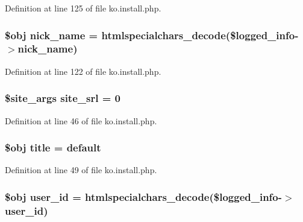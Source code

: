 Definition at line 125 of file ko.\+install.\+php.

\hypertarget{ko_8install_8php_a151ecae87a1f3d7e257aa089803086bd}{}
\subsubsection[{nick\+\_\+name}]{\setlength{\rightskip}{0pt plus 5cm}\$obj nick\+\_\+name = htmlspecialchars\+\_\+decode(\$logged\+\_\+info-\/$>$nick\+\_\+name)}\label{ko_8install_8php_a151ecae87a1f3d7e257aa089803086bd}


Definition at line 122 of file ko.\+install.\+php.

\hypertarget{ko_8install_8php_a8b1406b4ad1048041558dce6bfe89004}{}
\subsubsection[{site\+\_\+srl}]{\setlength{\rightskip}{0pt plus 5cm}\$site\+\_\+args site\+\_\+srl = 0}\label{ko_8install_8php_a8b1406b4ad1048041558dce6bfe89004}


Definition at line 46 of file ko.\+install.\+php.

\hypertarget{ko_8install_8php_a5b072c5fd1d2228c6ba5cee13cd142e3}{}
\subsubsection[{title}]{\setlength{\rightskip}{0pt plus 5cm}\$obj title = \textquotesingle{}default\textquotesingle{}}\label{ko_8install_8php_a5b072c5fd1d2228c6ba5cee13cd142e3}


Definition at line 49 of file ko.\+install.\+php.

\hypertarget{ko_8install_8php_a74f1a394389d774e5b4cd5d1d15413f7}{}
\subsubsection[{user\+\_\+id}]{\setlength{\rightskip}{0pt plus 5cm}\$obj user\+\_\+id = htmlspecialchars\+\_\+decode(\$logged\+\_\+info-\/$>$user\+\_\+id)}\label{ko_8install_8php_a74f1a394389d774e5b4cd5d1d15413f7}


